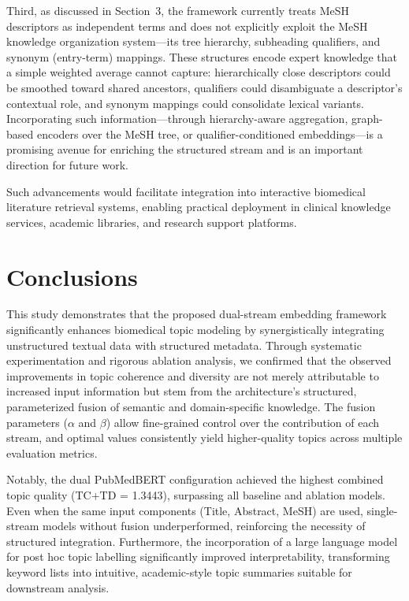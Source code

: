 \documentclass[authorproof,JACIII,researchpaper]{fujipressarticle}
\begin{document}
{\color{red}%
Third, as discussed in Section~3, the framework currently treats MeSH descriptors as independent terms and does not explicitly exploit the MeSH knowledge organization system---its tree hierarchy, subheading qualifiers, and synonym (entry-term) mappings. These structures encode expert knowledge that a simple weighted average cannot capture: hierarchically close descriptors could be smoothed toward shared ancestors, qualifiers could disambiguate a descriptor's contextual role, and synonym mappings could consolidate lexical variants. Incorporating such information---through hierarchy-aware aggregation, graph-based encoders over the MeSH tree, or qualifier-conditioned embeddings---is a promising avenue for enriching the structured stream and is an important direction for future work.
}%

Such advancements would facilitate integration into interactive biomedical literature retrieval systems, enabling practical deployment in clinical knowledge services, academic libraries, and research support platforms.

\section{Conclusions}

This study demonstrates that the proposed dual-stream embedding framework significantly enhances biomedical topic modeling by synergistically integrating unstructured textual data with structured metadata. Through systematic experimentation and rigorous ablation analysis, we confirmed that the observed improvements in topic coherence and diversity are not merely attributable to increased input information but stem from the architecture's structured, parameterized fusion of semantic and domain-specific knowledge. The fusion parameters ($\alpha$ and $\beta$) allow fine-grained control over the contribution of each stream, and optimal values consistently yield higher-quality topics across multiple evaluation metrics.

Notably, the dual PubMedBERT configuration achieved the highest combined topic quality (TC+TD = 1.3443), surpassing all baseline and ablation models. Even when the same input components (Title, Abstract, MeSH) are used, single-stream models without fusion underperformed, reinforcing the necessity of structured integration. Furthermore, the incorporation of a large language model for post hoc topic labelling significantly improved interpretability, transforming keyword lists into intuitive, academic-style topic summaries suitable for downstream analysis.
\end{document}
